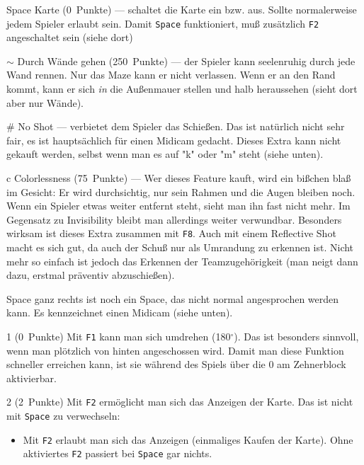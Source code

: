 \documentclass[12pt,twoside]{article}
\newcommand{\grad}{$^\circ$}
\newcommand{\deflabel}[1]{\bf #1\hfill}%
\newenvironment{deflist}[1]%
{\begin{list}{}%
{\settowidth{\labelwidth}{\bf #1}%
\setlength{\leftmargin}{\labelwidth}%
\addtolength{\leftmargin}{\labelsep}%
\renewcommand{\makelabel}{\deflabel}}}%
{\end{list}}%
\begin{document}
\begin{deflist}{Win}
\item[Space] Karte (0~Punkte) --- schaltet die Karte ein bzw. aus. Sollte 
normalerweise jedem Spieler erlaubt sein. Damit \verb|Space| funktioniert, 
mu\ss{} zu\-s\"atz\-lich \verb|F2| angeschaltet sein (siehe dort)


\item[$\sim$] Durch W\"ande gehen (250~Punkte) --- der Spieler kann 
seelenruhig durch jede Wand rennen. Nur das Maze kann er nicht verlassen. 
Wenn er an den Rand kommt, kann er sich {\em in\/} die Au\ss{}enmauer stellen 
und halb heraussehen (sieht dort aber nur W\"ande).


\item[\#] No Shot --- verbietet dem Spieler das Schie\ss{}en. Das ist nat\"urlich 
nicht sehr fair, es ist haupts\"achlich f\"ur einen Midicam gedacht. Dieses 
Extra kann nicht gekauft werden, selbst wenn man es auf "k" oder "m" 
steht (siehe unten).


\item[c] Colorlessness (75~Punkte) --- Wer dieses Feature kauft, wird ein 
bi\ss{}chen bla\ss{} im Gesicht: Er wird durchsichtig, nur sein Rahmen und die Augen 
bleiben noch. Wenn ein Spieler etwas weiter entfernt steht, sieht man ihn 
fast nicht mehr. Im Gegensatz zu Invisibility bleibt man allerdings weiter 
verwundbar. Besonders wirksam ist dieses Extra zusammen mit \verb|F8|. Auch 
mit einem Reflective Shot macht es sich gut, da auch der Schu\ss{} nur als 
Umrandung zu erkennen ist. Nicht mehr so einfach ist jedoch das Erkennen der 
Teamzugeh\"origkeit (man neigt dann dazu, erstmal pr\"aventiv abzuschie\ss{}en).


\item[Space] ganz rechts ist noch ein Space, das nicht normal angesprochen 
werden kann. Es kennzeichnet einen Midicam (siehe unten).


\item[1] (0~Punkte) Mit \verb|F1| kann man sich umdrehen (180\grad). Das ist 
besonders sinnvoll, wenn man pl\"otzlich von hinten angeschossen wird. Damit 
man diese Funktion schneller erreichen kann, ist sie w\"ahrend des Spiels \"uber 
die 0 am Zehnerblock aktivierbar.


\item[2] (2~Punkte) Mit \verb|F2| erm\"oglicht man sich das Anzeigen der 
Karte. Das ist nicht mit \verb|Space| zu verwechseln:

\begin{itemize}

\item Mit \verb|F2| erlaubt man sich das Anzeigen (einmaliges Kaufen der 
Karte). Ohne aktiviertes \verb|F2| passiert bei \verb|Space| gar nichts.



\end{itemize}
\end{deflist}
\end{document}
